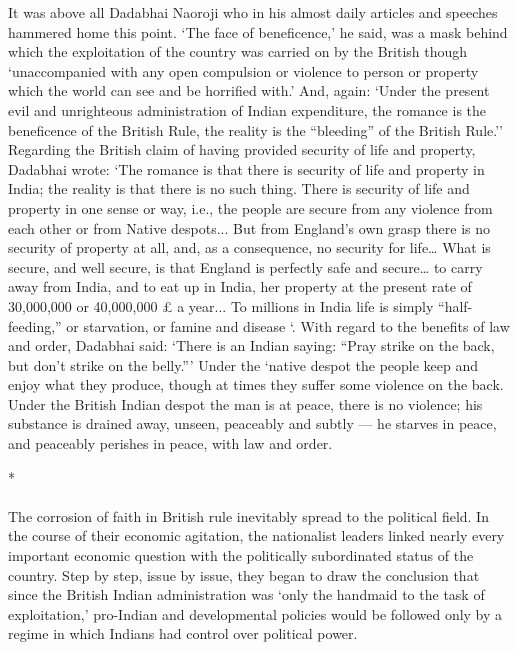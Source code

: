 It was above all Dadabhai Naoroji who in his almost daily articles and speeches hammered home this point. `The face of beneficence,' he said, was a mask behind which the exploitation of the country was carried on by the British though `unaccompanied with any open compulsion or violence to person or property which the world can see and be horrified with.' And, again: `Under the present evil and unrighteous administration of Indian expenditure, the romance is the beneficence of the British Rule, the reality is the ``bleeding'' of the British Rule.'' Regarding the British claim of having provided security of life and property, Dadabhai wrote: `The romance is that there is security of life and property in India; the reality is that there is no such thing. There is security of life and property in one sense or way, i.e., the people are secure from any violence from each other or from Native despots... But from England's own grasp there is no security of property at all, and, as a consequence, no security for life… What is secure, and well secure, is that England is perfectly safe and secure… to carry away from India, and to eat up in India, her property at the present rate of 30,000,000 or 40,000,000 £ a year... To millions in India life is simply ``half-feeding,'' or starvation, or famine and disease `. With regard to the benefits of law and order, Dadabhai said: `There is an Indian saying: ``Pray strike on the back, but don't strike on the belly.''' Under the `native despot the people keep and enjoy what they produce, though at times they suffer some violence on the back. Under the British Indian despot the man is at peace, there is no violence; his substance is drained away, unseen, peaceably and subtly --- he starves in peace, and peaceably perishes in peace, with law and order.

\begin{center}*\end{center}

\paragraph*{}


The corrosion of faith in British rule inevitably spread to the political field. In the course of their economic agitation, the nationalist leaders linked nearly every important economic question with the politically subordinated status of the country. Step by step, issue by issue, they began to draw the conclusion that since the British Indian administration was `only the handmaid to the task of exploitation,' pro-Indian and developmental policies would be followed only by a regime in which Indians had control over political power.

